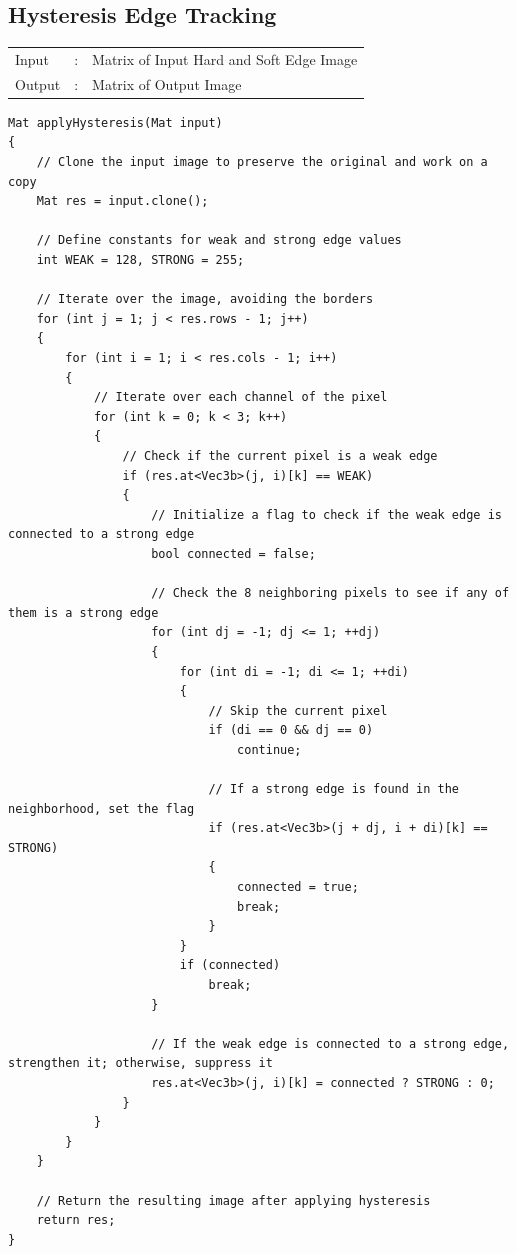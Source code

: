 \documentclass[12pt,a4paper]{report}
\begin{document}
\subsection{Hysteresis Edge Tracking}
\begin{tabular}{lll}
  Input  & : & Matrix of Input Hard and Soft Edge Image  \\
  Output & : & Matrix of Output Image \\
\end{tabular}
\begin{lstlisting}
Mat applyHysteresis(Mat input)
{
    // Clone the input image to preserve the original and work on a copy
    Mat res = input.clone();

    // Define constants for weak and strong edge values
    int WEAK = 128, STRONG = 255;

    // Iterate over the image, avoiding the borders
    for (int j = 1; j < res.rows - 1; j++)
    {
        for (int i = 1; i < res.cols - 1; i++)
        {
            // Iterate over each channel of the pixel
            for (int k = 0; k < 3; k++)
            {
                // Check if the current pixel is a weak edge
                if (res.at<Vec3b>(j, i)[k] == WEAK)
                {
                    // Initialize a flag to check if the weak edge is connected to a strong edge
                    bool connected = false;

                    // Check the 8 neighboring pixels to see if any of them is a strong edge
                    for (int dj = -1; dj <= 1; ++dj)
                    {
                        for (int di = -1; di <= 1; ++di)
                        {
                            // Skip the current pixel
                            if (di == 0 && dj == 0)
                                continue;

                            // If a strong edge is found in the neighborhood, set the flag
                            if (res.at<Vec3b>(j + dj, i + di)[k] == STRONG)
                            {
                                connected = true;
                                break;
                            }
                        }
                        if (connected)
                            break;
                    }

                    // If the weak edge is connected to a strong edge, strengthen it; otherwise, suppress it
                    res.at<Vec3b>(j, i)[k] = connected ? STRONG : 0;
                }
            }
        }
    }

    // Return the resulting image after applying hysteresis
    return res;
}
\end{lstlisting}
\end{document}
